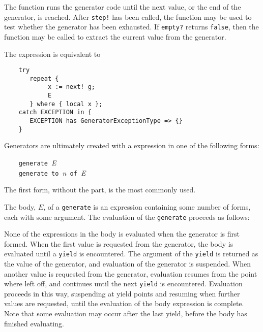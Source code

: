 
The function  runs the generator code until
the next value, or the end of the generator, is reached.
After \verb"step!" has been called, the function  may 
be used to test whether the generator has been exhausted.
If \verb"empty?" returns \verb"false", then the 
function may be called to extract the current value from the generator.

The expression  is equivalent to

\begin{small}
\begin{verbatim}
    try
       repeat {
            x := next! g;
            E
       } where { local x };
    catch EXCEPTION in {
       EXCEPTION has GeneratorExceptionType => {}
    }
\end{verbatim}
\end{small}


Generators are ultimately created with a  expression
in one of the following forms:

\verb"    generate "{\em E}\\
\verb"    generate to "{\em n}\verb" of "{\em E}

The first form, without the  part, is the most commonly used.

The body, $E$, of a \verb"generate" is an expression containing
some number of  forms, each with some argument.
The evaluation of the \verb"generate" proceeds as follows:

None of the expressions in the body is evaluated when the generator
is first formed.  When the first value is requested from the generator,
the body is evaluated until a \verb"yield" is encountered.
The argument of the \verb"yield" is returned as the value of the
generator, and evaluation of the generator is suspended.  
When another value is requested from the generator, 
evaluation resumes from the point where left off, and continues
until the next \verb"yield" is encountered.
Evaluation proceeds in this way, suspending at yield points and resuming
when further values are requested, until the evaluation of the
body expression is complete.  Note that some evaluation may occur
after the last yield, before the body has finished evaluating.


